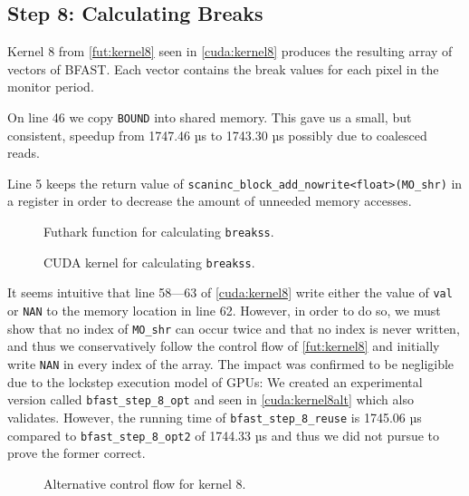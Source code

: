 \subsection{
    Step 8: Calculating Breaks
}

Kernel 8 from \autoref{fut:kernel8} seen in \autoref{cuda:kernel8} produces the
resulting array of vectors of \textsc{BFAST}. 
Each vector contains the break values for each pixel in the monitor period.

On line 46 we copy \texttt{BOUND} into shared memory. This gave us a small, but
consistent, speedup from 1747.46 µs to 1743.30 µs possibly due to coalesced
reads. %

Line 5 keeps the return value of
\texttt{scaninc\_block\_add\_nowrite<float>(MO\_shr)} in a register in order to
decrease the amount of unneeded memory accesses.%


\begin{figure}[H]
    \centering
    \caption{Futhark function for calculating \texttt{breakss}.}
    \label{fut:kernel8}
\end{figure}

\begin{figure}[H]
    \centering
    \caption{CUDA kernel for calculating  \texttt{breakss}.}
    \label{cuda:kernel8}
\end{figure}


It seems intuitive that line 58---63 of \autoref{cuda:kernel8} %
write either the value of \texttt{val} or \texttt{NAN} to the memory location in
line 62. However, in order to do so, we must show that no index of \texttt{MO\_shr} 
can occur twice and that no index is never written, and thus we conservatively follow the
control flow of \autoref{fut:kernel8} and initially write \texttt{NAN} in every
index of the array. 
The impact was confirmed to be negligible due to the lockstep execution
model of GPUs:
 We created an experimental version called \texttt{bfast\_step\_8\_opt} and seen
 in \autoref{cuda:kernel8alt} which also validates. However, the running time of
 \texttt{bfast\_step\_8\_reuse} is 1745.06 µs compared to \texttt{bfast\_step\_8\_opt2} of
 1744.33 µs and thus we did not pursue to prove the former correct.

\begin{figure}[H]
    \centering
    \caption{Alternative control flow for kernel 8.}
    \label{cuda:kernel8alt}
\end{figure}



